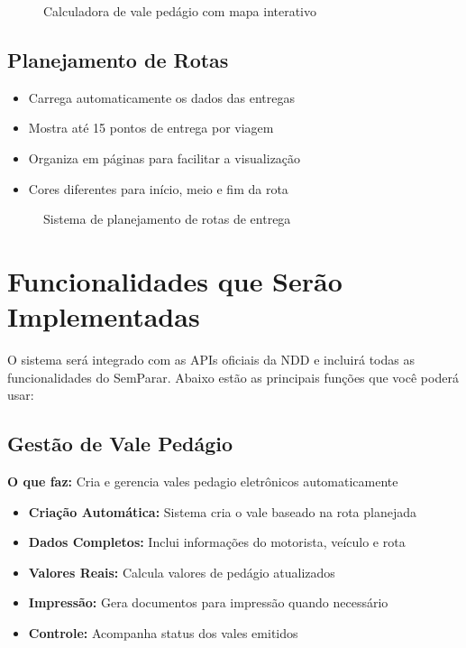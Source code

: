 \documentclass[12pt,a4paper]{article}
\begin{document}
\begin{figure}[H]
    \centering
    \fbox{\begin{minipage}{12cm}
        \centering
        \vspace{4cm}
        {\large [SCREENSHOT - Calculadora Vale Pedágio]}
        \vspace{4cm}
    \end{minipage}}
    \caption{Calculadora de vale pedágio com mapa interativo}
\end{figure}

\subsection{Planejamento de Rotas}
\begin{itemize}
    \item Carrega automaticamente os dados das entregas
    \item Mostra até 15 pontos de entrega por viagem
    \item Organiza em páginas para facilitar a visualização
    \item Cores diferentes para início, meio e fim da rota
\end{itemize}

\begin{figure}[H]
    \centering
    \fbox{\begin{minipage}{12cm}
        \centering
        \vspace{4cm}
        {\large [SCREENSHOT - Sistema de Rotas]}
        \vspace{4cm}
    \end{minipage}}
    \caption{Sistema de planejamento de rotas de entrega}
\end{figure}

\section{Funcionalidades que Serão Implementadas}

O sistema será integrado com as APIs oficiais da NDD e incluirá todas as funcionalidades do SemParar. Abaixo estão as principais funções que você poderá usar:

\subsection{Gestão de Vale Pedágio}
\textbf{O que faz:} Cria e gerencia vales pedagio eletrônicos automaticamente
\begin{itemize}
    \item \textbf{Criação Automática:} Sistema cria o vale baseado na rota planejada
    \item \textbf{Dados Completos:} Inclui informações do motorista, veículo e rota
    \item \textbf{Valores Reais:} Calcula valores de pedágio atualizados
    \item \textbf{Impressão:} Gera documentos para impressão quando necessário
    \item \textbf{Controle:} Acompanha status dos vales emitidos
\end{itemize}
\end{document}
